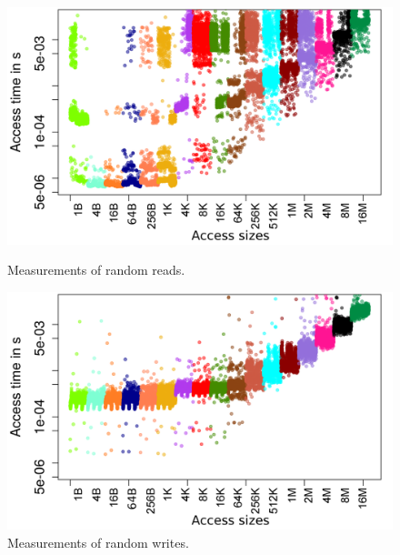 \documentclass{superfri}
\begin{document}
\begin{figure}[b]
	\centering
	\begin{minipage}[b]{0.47\textwidth}
		\includegraphics[width=\textwidth]{src/plot_SizeSorted_log_read_rnd.png}
		\caption{Measurements of random reads.}
		\label{read_rnd}
	\end{minipage}
	\hfill
	\begin{minipage}[b]{0.47\textwidth}
		\includegraphics[width=\textwidth]{src/plot_SizeSorted_log_write_rnd.png}
		\caption{Measurements of random writes.}
		\label{write_rnd}
	\end{minipage}
\end{figure}
\end{document}
